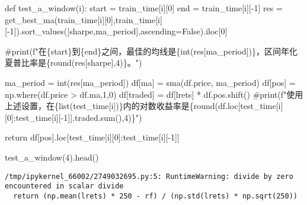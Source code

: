 \documentclass[
  letterpaper,
  DIV=11,
  numbers=noendperiod]{scrreprt}
\newenvironment{Shaded}{\begin{snugshade}}{\end{snugshade}}
\newcommand{\BuiltInTok}[1]{\textcolor[rgb]{0.00,0.23,0.31}{#1}}
\newcommand{\CommentTok}[1]{\textcolor[rgb]{0.37,0.37,0.37}{#1}}
\newcommand{\ControlFlowTok}[1]{\textcolor[rgb]{0.00,0.23,0.31}{#1}}
\newcommand{\DecValTok}[1]{\textcolor[rgb]{0.68,0.00,0.00}{#1}}
\newcommand{\KeywordTok}[1]{\textcolor[rgb]{0.00,0.23,0.31}{#1}}
\newcommand{\NormalTok}[1]{\textcolor[rgb]{0.00,0.23,0.31}{#1}}
\newcommand{\OperatorTok}[1]{\textcolor[rgb]{0.37,0.37,0.37}{#1}}
\newcommand{\StringTok}[1]{\textcolor[rgb]{0.13,0.47,0.30}{#1}}
\newcommand{\VariableTok}[1]{\textcolor[rgb]{0.07,0.07,0.07}{#1}}
\begin{document}
\begin{Shaded}
\begin{Highlighting}[]
\KeywordTok{def}\NormalTok{ test\_a\_window(i):}
\NormalTok{    start }\OperatorTok{=}\NormalTok{ train\_time[i][}\DecValTok{0}\NormalTok{]}
\NormalTok{    end }\OperatorTok{=}\NormalTok{ train\_time[i][}\OperatorTok{{-}}\DecValTok{1}\NormalTok{]}
\NormalTok{    res }\OperatorTok{=}\NormalTok{ get\_best\_ma(train\_time[i][}\DecValTok{0}\NormalTok{],train\_time[i][}\OperatorTok{{-}}\DecValTok{1}\NormalTok{]).sort\_values([}\StringTok{\textquotesingle{}sharpe\textquotesingle{}}\NormalTok{,}\StringTok{\textquotesingle{}ma\_period\textquotesingle{}}\NormalTok{],ascending}\OperatorTok{=}\VariableTok{False}\NormalTok{).iloc[}\DecValTok{0}\NormalTok{]}
    
    \CommentTok{\#print(f"在\{start\}到\{end\}之间，最佳的均线是\{int(res[\textquotesingle{}ma\_period\textquotesingle{}])\}，区间年化夏普比率是\{round(res[\textquotesingle{}sharpe\textquotesingle{}],4)\}。")}

\NormalTok{    ma\_period }\OperatorTok{=} \BuiltInTok{int}\NormalTok{(res[}\StringTok{\textquotesingle{}ma\_period\textquotesingle{}}\NormalTok{])}
\NormalTok{    df[}\StringTok{\textquotesingle{}ma\textquotesingle{}}\NormalTok{] }\OperatorTok{=}\NormalTok{ sma(df.price, ma\_period)}
\NormalTok{    df[}\StringTok{\textquotesingle{}pos\textquotesingle{}}\NormalTok{] }\OperatorTok{=}\NormalTok{ np.where(df.price }\OperatorTok{\textgreater{}}\NormalTok{ df.ma,}\DecValTok{1}\NormalTok{,}\DecValTok{0}\NormalTok{) }
\NormalTok{    df[}\StringTok{\textquotesingle{}traded\textquotesingle{}}\NormalTok{] }\OperatorTok{=}\NormalTok{ df[}\StringTok{\textquotesingle{}lrets\textquotesingle{}}\NormalTok{] }\OperatorTok{*}\NormalTok{ df.pos.shift() }
    \CommentTok{\#print(f"使用上述设置，在\{list(test\_time[i])\}内的对数收益率是\{round(df.loc[test\_time[i][0]:test\_time[i][{-}1]].traded.sum(),4)\}")}

    \ControlFlowTok{return}\NormalTok{ df[}\StringTok{\textquotesingle{}pos\textquotesingle{}}\NormalTok{].loc[test\_time[i][}\DecValTok{0}\NormalTok{]:test\_time[i][}\OperatorTok{{-}}\DecValTok{1}\NormalTok{]]}

\NormalTok{test\_a\_window(}\DecValTok{4}\NormalTok{).head()}
\end{Highlighting}
\end{Shaded}

\begin{verbatim}
/tmp/ipykernel_66002/2749032695.py:5: RuntimeWarning: divide by zero encountered in scalar divide
  return (np.mean(lrets) * 250 - rf) / (np.std(lrets) * np.sqrt(250))
\end{verbatim}
\end{document}
